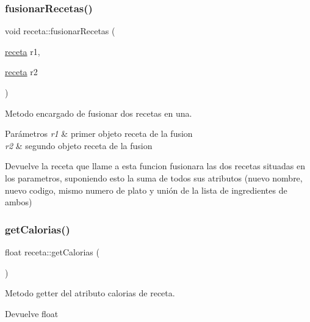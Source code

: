 \subsubsection{\texorpdfstring{fusionar\+Recetas()}{fusionarRecetas()}}
{\footnotesize\ttfamily void receta\+::fusionar\+Recetas (\begin{DoxyParamCaption}\item[{\hyperlink{classreceta}{receta}}]{r1,  }\item[{\hyperlink{classreceta}{receta}}]{r2 }\end{DoxyParamCaption})}



Metodo encargado de fusionar dos recetas en una. 


\begin{DoxyParams}{Parámetros}
{\em r1} & primer objeto receta de la fusion \\
\hline
{\em r2} & segundo objeto receta de la fusion \\
\hline
\end{DoxyParams}
\begin{DoxyReturn}{Devuelve}
la receta que llame a esta funcion fusionara las dos recetas situadas en los parametros, suponiendo esto la suma de todos sus atributos (nuevo nombre, nuevo codigo, mismo numero de plato y unión de la lista de ingredientes de ambos) 
\end{DoxyReturn}
\mbox{\label{classreceta_a668b197536226523765069118c1fa30d}} 
\subsubsection{\texorpdfstring{get\+Calorias()}{getCalorias()}}
{\footnotesize\ttfamily float receta\+::get\+Calorias (\begin{DoxyParamCaption}{ }\end{DoxyParamCaption})}



Metodo getter del atributo calorias de receta. 

\begin{DoxyReturn}{Devuelve}
float 
\end{DoxyReturn}
\mbox{\label{classreceta_a7d9969d8201bf98b3d4716e010aa00a7}} 
